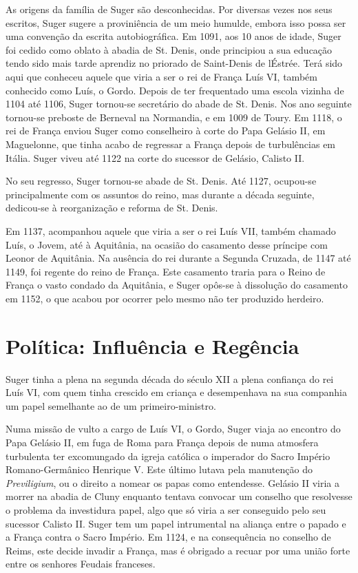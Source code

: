 \documentclass{article}
\begin{document}
As origens da família de Suger são desconhecidas. Por diversas vezes
nos seus escritos, Suger sugere a proviniência de um meio humulde,
embora isso possa ser uma convenção da escrita autobiográfica. Em
1091, aos 10 anos de idade, Suger foi cedido como oblato à abadia de
St. Denis, onde principiou a sua educação tendo sido mais tarde
aprendiz no priorado de Saint-Denis de lÉstrée. Terá sido aqui que
conheceu aquele que viria a ser o rei de França Luís VI, também
conhecido como Luís, o Gordo. Depois de ter frequentado uma escola
vizinha de 1104 até 1106, Suger tornou-se secretário do abade de
St. Denis. Nos ano seguinte tornou-se preboste de Berneval na
Normandia, e em 1009 de Toury. Em 1118, o rei de França enviou Suger
como conselheiro à corte do Papa Gelásio II, em Maguelonne, que tinha
acabo de regressar a França depois de turbulências em Itália. Suger
viveu até 1122 na corte do sucessor de Gelásio, Calisto II.

No seu regresso, Suger tornou-se abade de St. Denis. Até 1127,
ocupou-se principalmente com os assuntos do reino, mas durante a
década seguinte, dedicou-se à reorganização e reforma de St. Denis. 

Em 1137, acompanhou aquele que viria a ser o rei Luís VII, também
chamado Luís, o Jovem, até à Aquitânia, na ocasião do casamento desse
príncipe com Leonor de Aquitânia. Na ausência do rei durante a Segunda
Cruzada, de 1147 até 1149, foi regente do reino de França. Este
casamento traria para o Reino de França o vasto condado da Aquitânia,
e Suger opôs-se à dissolução do casamento em 1152, o que acabou por
ocorrer pelo mesmo não ter produzido herdeiro.

\section{Política: Influência e Regência}

Suger tinha a plena na segunda década do século XII a plena confiança
do rei Luís VI, com quem tinha crescido em criança e desempenhava na
sua companhia um papel semelhante ao de um primeiro-ministro.

Numa missão de vulto a cargo de Luís VI, o Gordo, Suger viaja ao
encontro do Papa Gelásio II, em fuga de Roma para França depois de
numa atmosfera turbulenta ter excomungado da igreja católica o
imperador do Sacro Império Romano-Germânico Henrique V. Este último
lutava pela manutenção do \emph{Previligium}, ou o direito a nomear os
papas como entendesse. Gelásio II viria a morrer na abadia de Cluny
enquanto tentava convocar um conselho que resolvesse o problema da
investidura papel, algo que só viria a ser conseguido pelo seu
sucessor Calisto II.  Suger tem um papel intrumental na aliança entre
o papado e a França contra o Sacro Império. Em 1124, e na consequência
no conselho de Reims, este decide invadir a França, mas é obrigado a
recuar por uma união forte entre os senhores Feudais franceses.
\end{document}

